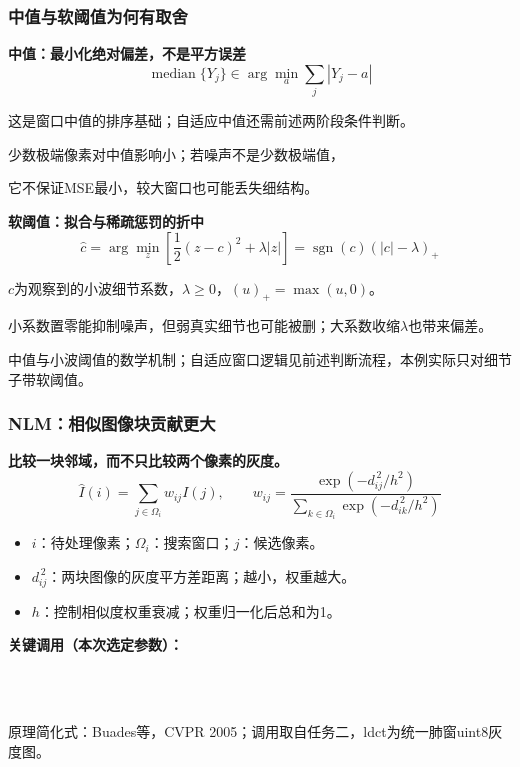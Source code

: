 \documentclass[11pt,aspectratio=169]{beamer}
\newcommand{\source}[1]{\vfill{\fontsize{7.5}{9}\selectfont\color{Muted}#1\par}}
\begin{document}
\begin{frame}
\frametitle{中值与软阈值为何有取舍}
\textbf{中值：最小化绝对偏差，不是平方误差}
\[
\operatorname{median}\{Y_j\}\in\arg\min_a\sum_j|Y_j-a|
\]
{\small 这是窗口中值的排序基础；自适应中值还需前述两阶段条件判断。\par
少数极端像素对中值影响小；若噪声不是少数极端值，\par
它不保证MSE最小，较大窗口也可能丢失细结构。}\par
\vspace{3mm}
\textbf{软阈值：拟合与稀疏惩罚的折中}
\[
\widehat c=\arg\min_z\left[\frac12(z-c)^2+\lambda|z|\right]
=\operatorname{sgn}(c)(|c|-\lambda)_+
\]
{\small $c$为观察到的小波细节系数，$\lambda\ge0$，$(u)_+=\max(u,0)$。\par
小系数置零能抑制噪声，但弱真实细节也可能被删；大系数收缩$\lambda$也带来偏差。}\par
\source{中值与小波阈值的数学机制；自适应窗口逻辑见前述判断流程，本例实际只对细节子带软阈值。}
\end{frame}

\begin{frame}
\frametitle{NLM：相似图像块贡献更大}
\textbf{比较一块邻域，而不只比较两个像素的灰度。}
\[
 \widehat I(i)=\sum_{j\in\Omega_i}w_{ij}I(j),\qquad
 w_{ij}=\frac{\exp(-d_{ij}^{\,2}/h^2)}{\displaystyle\sum_{k\in\Omega_i}\exp(-d_{ik}^{\,2}/h^2)}
\]
\begin{itemize}
\item $i$：待处理像素；$\Omega_i$：搜索窗口；$j$：候选像素。
\item $d_{ij}^{\,2}$：两块图像的灰度平方差距离；越小，权重越大。
\item $h$：控制相似度权重衰减；权重归一化后总和为1。
\end{itemize}
{\small\textbf{关键调用（本次选定参数）：}}\par
{\ttfamily\fontsize{9}{11}\selectfont
\noindent{}\\
\hspace*{1.5em}\\
\hspace*{1.5em}\par}
\source{原理简化式：Buades等，CVPR 2005；调用取自任务二，ldct为统一肺窗uint8灰度图。}
\end{frame}
\end{document}
